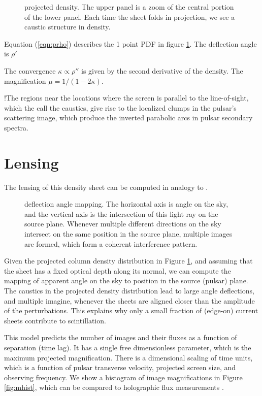 \documentclass[useAMS,usenatbib]{mn2e}
\begin{document}
\begin{figure}
\centerline{}
\caption{projected density.  The upper panel is a zoom of the central
  portion of the lower panel. Each time the sheet folds in projection,
we see a caustic structure in density.}
\label{fig:rho}
\end{figure}

Equation (\ref{eqn:prho}) describes the 1 point PDF in figure
\ref{fig:rho}.  The deflection angle is $\rho'$

The convergence $\kappa \propto \rho''$ is given by
the second derivative of the density.  The magnification
$\mu=1/(1-2\kappa)$.

!The regions near the locations where the screen is parallel
to the line-of-sight, which the call the caustics, give rise to the localized clumps in the pulsar's scattering image, which
produce the inverted parabolic arcs in pulsar secondary
spectra.

\section{Lensing}

The lensing of this density sheet can be computed in analogy to 
 \cite{2012MNRAS.421L.132P}.

\begin{figure}
\centerline{}
\caption{deflection angle mapping. The horizontal axis is angle on the
sky, and the vertical axis is the intersection of this light ray on
the source plane.  Whenever multiple different directions on the sky
intersect on the same position in the source plane, multiple images
are formed, which form a coherent interference pattern.}
\label{fig:dt}
\end{figure}

Given the projected column density distribution in Figure \ref{fig:rho}, and assuming that
the sheet has a fixed optical depth along its normal, we
can compute the mapping of apparent angle on the sky to position in the
source (pulsar) plane.  The caustics in the projected density
distribution lead to large angle deflections, and multiple imagine,
whenever the sheets are aligned closer than the amplitude of the
perturbations.  This explains why only a small fraction of (edge-on) current
sheets contribute to scintillation.

This model predicts the number of images and their fluxes as a
function of separation (time lag).  It has a single free dimensionless
parameter, which is the maximum projected magnification.  There is a
dimensional scaling of time units, which is a function of pulsar
transverse velocity, projected screen size, and observing frequency.
We show a histogram of image magnifications in Figure \ref{fig:mhist},
which can be compared to holographic flux measurements
\cite{2008MNRAS.388.1214W}.
\end{document}
